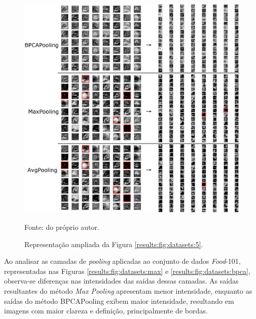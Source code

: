 \begin{figure}[H]
    \centering
    \caption{Representação ampliada da Figura \ref{results:fig:datasets:5}.}
    \label{results:fig:datasets:5v2}
    \includegraphics[width=1\textwidth]{recursos/imagens/results/cifar_blocksv2.png}

    Fonte: do próprio autor.
\end{figure}


Ao analisar as camadas de \textit{pooling} aplicadas ao conjunto de dados \textit{Food}-101, representadas nas Figuras \ref{results:fig:datasets:max} e \ref{results:fig:datasets:bpca}, observa-se diferenças nas intensidades das saídas dessas camadas. As saídas resultantes do método \textit{Max Pooling} apresentam menor intensidade, enquanto as saídas do método BPCAPooling exibem maior intensidade, resultando em imagens com maior clareza e definição, principalmente de bordas.

